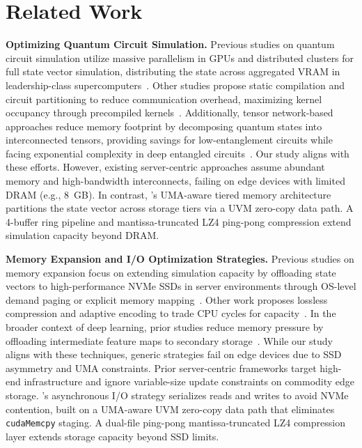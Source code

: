 \section{Related Work}
\label{sec:related}
\noindent\textbf{Optimizing Quantum Circuit Simulation.} Previous studies on quantum circuit simulation utilize massive parallelism in GPUs and distributed clusters for full state vector simulation, distributing the state across aggregated VRAM in leadership-class supercomputers~\cite{10.1145/3771577, haner20175, chen201864}. Other studies propose static compilation and circuit partitioning to reduce communication overhead, maximizing kernel occupancy through precompiled kernels~\cite{xu2024atlas, zhang2021hyquas, li2021sv}. Additionally, tensor network-based approaches reduce memory footprint by decomposing quantum states into interconnected tensors, providing savings for low-entanglement circuits while facing exponential complexity in deep entangled circuits~\cite{burgholzer2022simulation, kim2025swiftn, huang2021efficient, lykov2022tensor}. Our study aligns with these efforts. However, existing server-centric approaches assume abundant memory and high-bandwidth interconnects, failing on edge devices with limited DRAM (e.g., 8~GB). In contrast, \EdgeQuantum's UMA-aware tiered memory architecture partitions the state vector across storage tiers via a UVM zero-copy data path. A 4-buffer ring pipeline and mantissa-truncated LZ4 ping-pong compression extend simulation capacity beyond DRAM.

\noindent\textbf{Memory Expansion and I/O Optimization Strategies.} Previous studies on memory expansion focus on extending simulation capacity by offloading state vectors to high-performance NVMe SSDs in server environments through OS-level demand paging or explicit memory mapping~\cite{park2022snuqs, zhang2025bmqsim}. Other work proposes lossless compression and adaptive encoding to trade CPU cycles for capacity~\cite{zhang2025bmqsim, wu2018memory, wu2019full, song2023efficient}. In the broader context of deep learning, prior studies reduce memory pressure by offloading intermediate feature maps to secondary storage~\cite{7783721, 264816, 10.1145/3630108}. While our study aligns with these techniques, generic strategies fail on edge devices due to SSD asymmetry and UMA constraints. Prior server-centric frameworks target high-end infrastructure and ignore variable-size update constraints on commodity edge storage. \EdgeQuantum's asynchronous I/O strategy serializes reads and writes to avoid NVMe contention, built on a UMA-aware UVM zero-copy data path that eliminates \texttt{cudaMemcpy} staging. A dual-file ping-pong mantissa-truncated LZ4 compression layer extends storage capacity beyond SSD limits.

